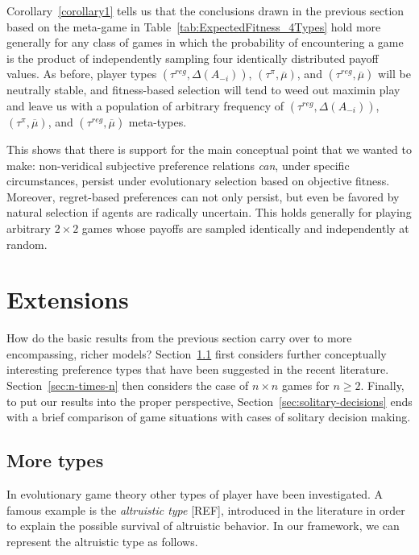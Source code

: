 \documentclass[fleqn,reqno,11pt]{article}
\begin{document}
Corollary~\ref{corollary1} tells us that the conclusions drawn in the previous section based on
the meta-game in Table~\ref{tab:ExpectedFitness_4Types} hold more generally for any class of
games in which the probability of encountering a game is the product of independently sampling
four identically distributed payoff values. As before, player types
$(\tau^{reg}, \Delta(A_{-i}))$, $(\tau^{\pi}, \overline{\mu})$, and
$(\tau^{reg}, \overline{\mu})$ will be neutrally stable, and fitness-based selection will tend
to weed out maximin play and leave us with a population of arbitrary frequency of
$(\tau^{reg}, \Delta(A_{-i}))$, $(\tau^{\pi}, \overline{\mu})$, and
$(\tau^{reg}, \overline{\mu})$ meta-types.

This shows that there is support for the main conceptual point that we wanted to make:
non-veridical subjective preference relations \emph{can}, under specific circumstances, persist
under evolutionary selection based on objective fitness. Moreover, regret-based preferences can
not only persist, but even be favored by natural selection if agents are radically
uncertain. This holds generally for playing arbitrary $2 \times 2$ games whose payoffs are
sampled identically and independently at random.

\section{Extensions}
\label{sec:extensions}

How do the basic results from the previous section carry over to more encompassing, richer
models? Section~\ref{sec:more-types} first considers further conceptually interesting
preference types that have been suggested in the recent literature. Section~\ref{sec:n-times-n}
then considers the case of $n \times n$ games for $n \ge 2$. Finally, to put our results into
the proper perspective, Section~\ref{sec:solitary-decisions} ends with a brief comparison of
game situations with cases of solitary decision making.

\subsection{More types}
\label{sec:more-types}


In evolutionary game theory other types of player have been investigated. A famous example is the \textit{altruistic type} [REF], introduced in the literature in order to explain the possible survival of altruistic behavior. In our framework, we can represent the altruistic type as follows. 
\end{document}

